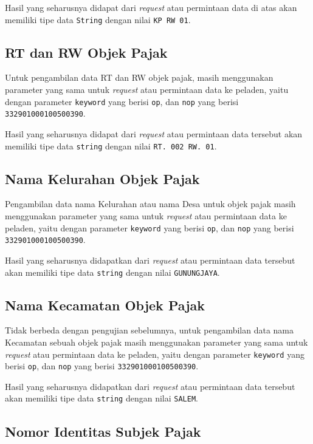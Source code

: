 Hasil yang seharusnya didapat dari \textit{request} atau permintaan data di atas akan memiliki tipe data \texttt{String} dengan nilai \texttt{KP RW 01}.

\subsection{RT dan RW Objek Pajak}

Untuk pengambilan data RT dan RW objek pajak, masih menggunakan parameter yang sama untuk \textit{request} atau permintaan data ke peladen, yaitu dengan parameter \texttt{keyword} yang berisi \texttt{op}, dan \texttt{nop} yang berisi \texttt{332901000100500390}.

Hasil yang seharusnya didapat dari \textit{request} atau permintaan data tersebut akan memiliki tipe data \texttt{string} dengan nilai \texttt{RT. 002 RW. 01}.

\subsection{Nama Kelurahan Objek Pajak}

Pengambilan data nama Kelurahan atau nama Desa untuk objek pajak masih menggunakan parameter yang sama untuk \textit{request} atau permintaan data ke peladen, yaitu dengan parameter \texttt{keyword} yang berisi \texttt{op}, dan \texttt{nop} yang berisi \texttt{332901000100500390}.

Hasil yang seharusnya didapatkan dari \textit{request} atau permintaan data tersebut akan memiliki tipe data \texttt{string} dengan nilai \texttt{GUNUNGJAYA}.

\subsection{Nama Kecamatan Objek Pajak}

Tidak berbeda dengan pengujian sebelumnya, untuk pengambilan data nama Kecamatan sebuah objek pajak masih menggunakan parameter yang sama untuk \textit{request} atau permintaan data ke peladen, yaitu dengan parameter \texttt{keyword} yang berisi \texttt{op}, dan \texttt{nop} yang berisi \texttt{332901000100500390}.

Hasil yang seharusnya didapatkan dari \textit{request} atau permintaan data tersebut akan memiliki tipe data \texttt{string} dengan nilai \texttt{SALEM}.

\subsection{Nomor Identitas Subjek Pajak}

